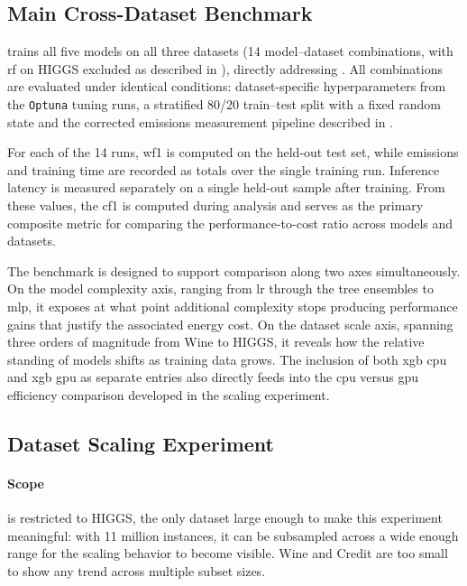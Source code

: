\subsection{Main Cross-Dataset Benchmark}
\label{design_main_benchmark}\label{exp:1}

 trains all five models on all three datasets (14 model--dataset combinations, with \gls{rf} on HIGGS excluded as described in ), directly addressing . All combinations are evaluated under identical conditions: dataset-specific hyperparameters from the \texttt{Optuna} tuning runs, a stratified 80/20 train--test split with a fixed random state and the corrected emissions measurement pipeline described in .

For each of the 14 runs, \gls{wf1} is computed on the held-out test set, while emissions and training time are recorded as totals over the single training run. Inference latency is measured separately on a single held-out sample after training. From these values, the \gls{cf1} is computed during analysis and serves as the primary composite metric for comparing the performance-to-cost ratio across models and datasets.

The benchmark is designed to support comparison along two axes simultaneously. On the model complexity axis, ranging from \gls{lr} through the tree ensembles to \gls{mlp}, it exposes at what point additional complexity stops producing performance gains that justify the associated energy cost. On the dataset scale axis, spanning three orders of magnitude from Wine to HIGGS, it reveals how the relative standing of models shifts as training data grows. The inclusion of both \gls{xgb} \gls{cpu} and \gls{xgb} \gls{gpu} as separate entries also directly feeds into the \gls{cpu} versus \gls{gpu} efficiency comparison developed in the scaling experiment.

\subsection{Dataset Scaling Experiment}
\label{design_scaling}\label{exp:2}

\paragraph{Scope}
 is restricted to HIGGS, the only dataset large enough to make this experiment meaningful: with 11 million instances, it can be subsampled across a wide enough range for the scaling behavior to become visible. Wine and Credit are too small to show any trend across multiple subset sizes.

